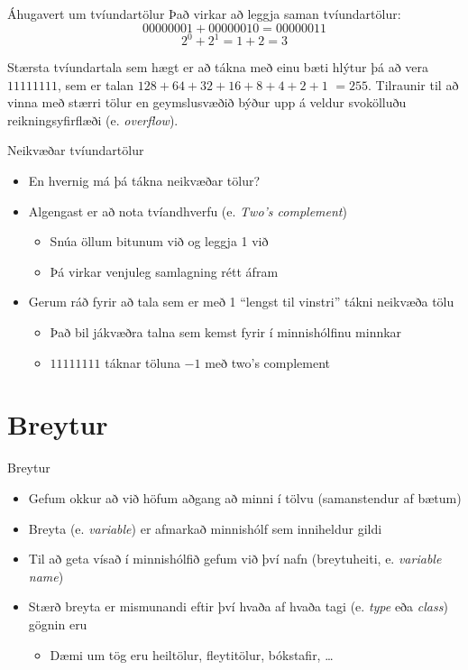 \documentclass[handout]{beamer}
\begin{document}
\begin{frame}{Áhugavert um tvíundartölur}
Það virkar að leggja saman tvíundartölur: 
\[
  00000001 + 00000010 = 00000011
\]
\[
 2^0 + 2^1 = 1 + 2 = 3
\]

Stærsta tvíundartala sem hægt er að tákna með einu bæti hlýtur þá að vera $11111111$, sem er talan $128+64+32+16+8+4+2+1$  $=  255$. Tilraunir til að vinna með stærri tölur en geymslusvæðið býður upp á veldur svokölluðu reikningsyfirflæði (e. \emph{overflow}).
\end{frame}

\begin{frame}{Neikvæðar tvíundartölur}
\begin{itemize}
 \item En hvernig má þá tákna neikvæðar tölur? \pause
 \item Algengast er að nota tvíandhverfu (e. \emph{Two's complement})
 \begin{itemize}
  \item Snúa öllum bitunum við og leggja 1 við
  \item Þá virkar venjuleg samlagning rétt áfram
 \end{itemize}
 \item Gerum ráð fyrir að tala sem er með 1 ``lengst til vinstri'' tákni neikvæða tölu
 \begin{itemize}
  \item Það bil jákvæðra talna sem kemst fyrir í minnishólfinu minnkar
  \item $11111111$ táknar töluna $-1$ með two's complement
 \end{itemize}
\end{itemize}
\end{frame}

\section{Breytur}

\begin{frame}{Breytur}
\begin{itemize}
 \item Gefum okkur að við höfum aðgang að minni í tölvu (samanstendur af bætum)
 \item Breyta (e. \emph{variable}) er afmarkað minnishólf sem inniheldur gildi
 \item Til að geta vísað í minnishólfið gefum við því nafn (breytuheiti, e. \emph{variable name})
 \item Stærð breyta er mismunandi eftir því hvaða af hvaða tagi (e. \emph{type} eða \emph{class}) gögnin eru
 \begin{itemize}
  \item Dæmi um tög eru heiltölur, fleytitölur, bókstafir, \ldots
 \end{itemize}
\end{itemize}
\end{frame}
\end{document}

